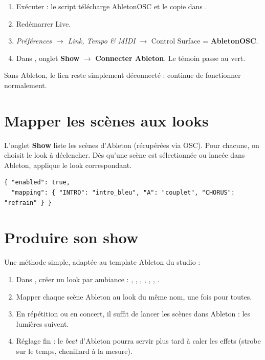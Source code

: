 \begin{enumerate}[leftmargin=1.6em]
  \item Exécuter  : le script
        télécharge AbletonOSC et le copie dans
        .
  \item Redémarrer Live.
  \item \emph{Préférences $\rightarrow$ Link, Tempo \& MIDI} $\rightarrow$
        Control Surface = \textbf{AbletonOSC}.
  \item Dans \Icare{}, onglet \textbf{Show} $\rightarrow$ \textbf{Connecter
        Ableton}. Le témoin passe au vert.
\end{enumerate}

\begin{note}
Sans Ableton, le lien reste simplement \og{}déconnecté\fg{} : \Icare{} continue
de fonctionner normalement.
\end{note}

\section{Mapper les scènes aux looks}

L'onglet \textbf{Show} liste les scènes d'Ableton (récupérées via OSC). Pour
chacune, on choisit le look à déclencher. Dès qu'une scène est sélectionnée ou
lancée dans Ableton, \Icare{} applique le look correspondant.

\begin{lstlisting}[caption={Mapping persistant (scenes.json).},numbers=none]
{ "enabled": true,
  "mapping": { "INTRO": "intro_bleu", "A": "couplet", "CHORUS": "refrain" } }
\end{lstlisting}

\section{Produire son show}

Une méthode simple, adaptée au template Ableton du studio :

\begin{enumerate}[leftmargin=1.6em]
  \item Dans \Icare{}, créer un look par ambiance : ,
        , , , , ,
        .
  \item Mapper chaque scène Ableton au look du même nom, une fois pour toutes.
  \item En répétition ou en concert, il suffit de lancer les scènes dans
        Ableton : les lumières suivent.
  \item Réglage fin : le \emph{beat} d'Ableton pourra servir plus tard à caler
        les effets (strobe sur le temps, chenillard à la mesure).
\end{enumerate}

